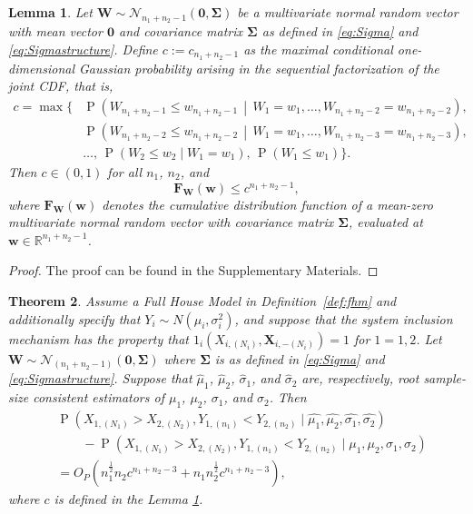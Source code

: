 \documentclass[12pt]{article}
\DeclareMathOperator*{\Prob}{P}
\newtheorem{theorem}{Theorem}[section]
\newtheorem{lemma}[theorem]{Lemma}
\begin{document}
\begin{lemma} \label{lemma:wmax}
Let $\mathbf{W} \sim \mathcal{N}_{n_1+n_2-1}(\boldsymbol{0}, \boldsymbol{\Sigma})$ be a multivariate normal random vector with mean vector $\boldsymbol{0}$ and covariance matrix $\boldsymbol{\Sigma}$ as defined in \eqref{eq:Sigma} and \eqref{eq:Sigmastructure}. Define $c := c_{n_1+n_2-1}$ as the maximal conditional one-dimensional Gaussian probability arising in the sequential factorization of the joint CDF, that is,
\begin{equation} \label{eq:wn}
\begin{split}
  c = \max \bigg\{&
  \Prob\!\left(W_{n_1+n_2-1} \le w_{n_1+n_2-1}\,\middle|\, W_1=w_1,\dots,W_{n_1+n_2-2}=w_{n_1+n_2-2}\right),\\
  &\Prob\!\left(W_{n_1+n_2-2} \le w_{n_1+n_2-2}
		\,\middle|\,
		W_1=w_1,\dots,W_{n_1+n_2-3}=w_{n_1+n_2-3}\right),\\
  &\dots,\, \Prob(W_2 \le w_2 \mid W_1=w_1),\, \Prob(W_1 \le w_1)
\bigg\}.
\end{split}
\end{equation}
Then $c \in (0,1)$ for all $n_1$, $n_2$, and 
\begin{equation} \label{eq:wmax}
	\mathbf{F}_{\mathbf{W}}(\mathbf{w})
 \leq c^{n_1+n_2-1},
\end{equation}
where $\mathbf{F}_{\mathbf{W}}(\mathbf{w})$ denotes the cumulative distribution function of a mean-zero multivariate normal random vector with covariance matrix $\boldsymbol{\Sigma}$, evaluated at $\mathbf{w} \in \mathbb{R}^{n_1+n_2-1}$.
\end{lemma}

\begin{proof}
	The proof can be found in the Supplementary Materials. 
\end{proof}



\begin{theorem}
\label{theorem:asymptotic}
Assume a Full House Model in Definition~\ref{def:fhm} and additionally specify that $Y_i \sim N(\mu_i,\sigma_i^2)$, and suppose that the system inclusion mechanism has the property that $1_i(X_{i,(N_i)}, \textbf{X}_{i,-(N_i)}) = 1$ for $1 = 1,2$. Let $\mathbf{W} \sim \mathcal{N}_{(n_1 + n_2 - 1)}(\boldsymbol{0}, \boldsymbol{\Sigma})$ where $\boldsymbol{\Sigma}$ is as defined in \eqref{eq:Sigma} and \eqref{eq:Sigmastructure}. Suppose that $\hat{\mu}_1$, $\hat{\mu}_2$, $\hat{\sigma}_1$, and $\hat{\sigma}_2$ are, respectively, root sample-size consistent estimators of $\mu_1$, $\mu_2$, $\sigma_1$, and $\sigma_2$. Then 	
	\begin{align*}
		&\Prob\left(X_{1,(N_1)} > X_{2,(N_2)}, Y_{1,(n_1)} < Y_{2,(n_2)} \mid \hat{\mu_1}, \hat{\mu_2}, \hat{\sigma_1}, \hat{\sigma_2} \right) \\
		&\qquad- \Prob\left(X_{1,(N_1)} > X_{2,(N_2)}, Y_{1,(n_1)} < Y_{2,(n_2)} \mid \mu_1, \mu_2, \sigma_1, \sigma_2\right) \\ 
		&=  O_P(n_1^{\frac{1}{2}}n_2c^{n_1+n_2-3} + n_1n_2^{\frac{1}{2}}c^{n_1+n_2-3}),
	\end{align*}
where $c$ is defined in the Lemma \ref{lemma:wmax}.
\end{theorem}
\end{document}
